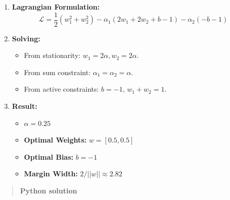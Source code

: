 \documentclass[
  letterpaper,
  DIV=11,
  numbers=noendperiod]{scrreprt}
\providecommand{\tightlist}{%
  \setlength{\itemsep}{0pt}\setlength{\parskip}{0pt}}
\begin{document}
\begin{enumerate}
\def\labelenumi{\arabic{enumi}.}
\tightlist
\item
  \textbf{Lagrangian Formulation:}
  \[\mathcal{L} = \frac{1}{2}(w_1^2 + w_2^2) - \alpha_1 (2w_1 + 2w_2 + b - 1) - \alpha_2 (-b - 1)\]
\item
  \textbf{Solving:}

  \begin{itemize}
  \tightlist
  \item
    From stationarity: \(w_1 = 2\alpha, w_2 = 2\alpha\).
  \item
    From sum constraint: \(\alpha_1 = \alpha_2 = \alpha\).
  \item
    From active constraints: \(b = -1\), \(w_1 + w_2 = 1\).
  \end{itemize}
\item
  \textbf{Result:}

  \begin{itemize}
  \tightlist
  \item
    \(\alpha = 0.25\)
  \item
    \textbf{Optimal Weights:} \(w = [0.5, 0.5]\)
  \item
    \textbf{Optimal Bias:} \(b = -1\)
  \item
    \textbf{Margin Width:} \(2/||w|| \approx 2.82\)
  \end{itemize}
\end{enumerate}

\begin{quote}
\textbf{Python solution}
\end{quote}
\end{document}
